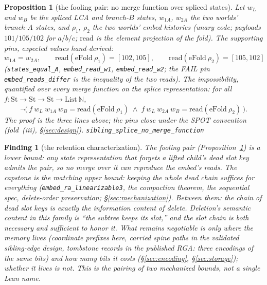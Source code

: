 \documentclass[11pt]{article}
\newtheorem{proposition}[theorem]{Proposition}
\newtheorem*{finding}{Finding}
\newcommand{\lean}[1]{\texttt{#1}}
\begin{document}
\begin{proposition}[the fooling pair: no merge function over spliced
states]
\label{prop:foolpair}
Let $w_L$ and $w_B$ be the spliced LCA and branch-$B$ states,
$w_{1A}$, $w_{2A}$ the two worlds' branch-$A$ states, and $\rho_1$,
$\rho_2$ the two worlds' embed histories (unary code; payloads $101 /
105 / 102$ for $a / b / c$; $\mathrm{read}$ is the element projection
of the fold). The supporting pins, expected values hand-derived:
\[
  w_{1A} = w_{2A}, \qquad
  \mathrm{read}(\mathrm{eFold}\ \rho_1) = [102, 105], \qquad
  \mathrm{read}(\mathrm{eFold}\ \rho_2) = [105, 102]
\]
(\lean{states\_equal\_A}, \lean{embed\_read\_w1},
\lean{embed\_read\_w2}; the FAIL pin \lean{embed\_reads\_differ} is
the inequality of the two reads). The impossibility, quantified over
\emph{every} merge function on the splice representation: for all
$f : \mathrm{St} \to \mathrm{St} \to \mathrm{St} \to
\mathrm{List}\ \mathbb{N}$,
\[
  \neg\bigl(\, f\ w_L\ w_{1A}\ w_B = \mathrm{read}(\mathrm{eFold}\
  \rho_1) \;\wedge\; f\ w_L\ w_{2A}\ w_B =
  \mathrm{read}(\mathrm{eFold}\ \rho_2) \,\bigr).
\]
The proof is the three lines above; the pins close under the SPOT
convention (fold~(iii), \S\ref{sec:design}).
\hfill\lean{sibling\_splice\_no\_merge\_function}
\end{proposition}

\begin{finding}[the retention characterization]
The fooling pair (Proposition~\ref{prop:foolpair}) is a \emph{lower}
bound: any state representation that forgets a lifted child's dead
slot key admits the pair, so no merge over it can reproduce the
embed's reads. The capstone is the matching \emph{upper} bound:
keeping the whole dead chain suffices for everything
(\lean{embed\_ra\_linearizable3}, the compaction theorem, the
sequential spec, delete-order preservation;
\S\ref{sec:mechanization}). Between them: \emph{the chain of dead slot
keys is exactly the information content of delete}. Deletion's
semantic content in this family is ``the subtree keeps its slot,'' and
the slot chain is both necessary and sufficient to honor it. What
remains negotiable is only \emph{where} the memory lives (coordinate
prefixes here, carried spine paths in the validated sibling-edge
design, tombstone records in the published RGA: three encodings of the
same bits) and \emph{how many bits} it costs (\S\ref{sec:encoding},
\S\ref{sec:storage}); whether it lives is not. This is the pairing of
two mechanized bounds, not a single Lean name.
\end{finding}
\end{document}
